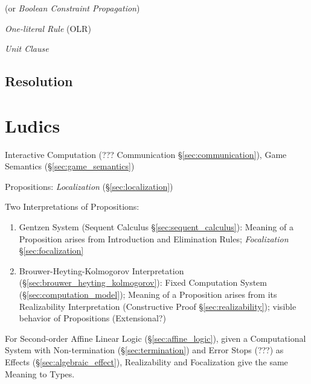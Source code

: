 (or \emph{Boolean Constraint Propagation})

\emph{One-literal Rule} (OLR)

\emph{Unit Clause}



\subsection{Resolution}\label{sec:resolution}



\section{Ludics} \label{sec:ludics}

\cite{girard01}

Interactive Computation (??? Communication \S\ref{sec:communication}),
Game Semantics (\S\ref{sec:game_semantics})

Propositions: \emph{Localization} (\S\ref{sec:localization})

Two Interpretations of Propositions:

\begin{enumerate}
  \item Gentzen System (Sequent Calculus
    \S\ref{sec:sequent_calculus}): Meaning of a Proposition arises
    from Introduction and Elimination Rules; \emph{Focalization}
    \S\ref{sec:focalization}

  \item Brouwer-Heyting-Kolmogorov Interpretation
    (\S\ref{sec:brouwer_heyting_kolmogorov}): Fixed Computation System
    (\S\ref{sec:computation_model}); Meaning of a Proposition arises
    from its Realizability Interpretation (Constructive Proof
    \S\ref{sec:realizability}); visible behavior of Propositions
    (Extensional?)
\end{enumerate}

For Second-order Affine Linear Logic (\S\ref{sec:affine_logic}), given
a Computational System with Non-termination (\S\ref{sec:termination})
and Error Stops (???) as Effects (\S\ref{sec:algebraic_effect}),
Realizability and Focalization give the same Meaning to Types.



